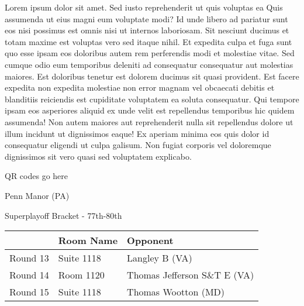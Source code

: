 \documentclass{article}%
\begin{document}
\vspace*{8pt}%
\linebreak%
\newline%
\newline%
Lorem ipsum dolor sit amet. Sed iusto reprehenderit ut quis voluptas ea Quis assumenda ut eius magni eum voluptate modi? Id unde libero ad pariatur sunt eos nisi possimus est omnis nisi ut internos laboriosam. Sit nesciunt ducimus et totam maxime est voluptas vero sed itaque nihil. Et expedita culpa et fuga sunt quo esse ipsam eos doloribus autem rem perferendis modi et molestiae vitae.\newline%
\newline%
Sed cumque odio eum temporibus deleniti ad consequatur consequatur aut molestias maiores. Est doloribus tenetur est dolorem ducimus sit quasi provident. Est facere expedita non expedita molestiae non error magnam vel obcaecati debitis et blanditiis reiciendis est cupiditate voluptatem ea soluta consequatur. Qui tempore ipsam eos asperiores aliquid ex unde velit est repellendus temporibus hic quidem assumenda!\newline%
\newline%
Non autem maiores aut reprehenderit nulla sit repellendus dolore ut illum incidunt ut dignissimos eaque! Ex aperiam minima eos quis dolor id consequatur eligendi ut culpa galisum. Non fugiat corporis vel doloremque dignissimos sit vero quasi sed voluptatem explicabo.\newline%
\newline%
%
\vspace*{30pt}%
\begin{center}%
\begin{Huge}%
QR codes go here%
\end{Huge}%
\end{center}%
\newpage%
\begin{center}%
\begin{Huge}%
Penn Manor (PA)%
\end{Huge}%
\vspace*{8pt}%
\linebreak%
\begin{Large}%
Superplayoff Bracket {-} 77th{-}80th%
\end{Large}%
\end{center}%
%
\begin{tabularx}{\textwidth}{|c|Y|Y|}%
\hline%
&Room Name&Opponent\\%
\hline%
Round 13&Suite 1118&Langley B (VA)\\%
Round 14&Room 1120&Thomas Jefferson S\&T E (VA)\\%
Round 15&Suite 1118&Thomas Wootton (MD)\\%
\hline%
\end{tabularx}%
\end{document}
